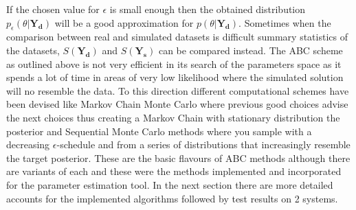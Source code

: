 \documentclass[12pt,a4paper,titlepage]{article}
\begin{document}
If the chosen value for $\epsilon$ is small enough then the obtained distribution $p_\epsilon(\theta | \mathbf{Y_{d}})$ will be a good approximation for $p(\theta | \mathbf{Y_{d}})$. Sometimes when the comparison between real and simulated datasets is difficult summary statistics of the datasets, $S(\mathbf{Y_{d}})$ and $S(\mathbf{Y_{s}})$ can be compared instead. The ABC scheme as outlined above is not very efficient in its search of the parameters space as it spends a lot of time in areas of very low likelihood where the simulated solution will no resemble the data. To this direction different computational schemes have been devised like Markov Chain Monte Carlo\cite{marjoram2003markov} where previous good choices advise the next choices thus creating a Markov Chain with stationary distribution the posterior and Sequential Monte Carlo methods where you sample with a decreasing $\epsilon$-schedule and from a series of distributions that increasingly resemble the target posterior\cite{del2006sequential, sisson2007sequential, toni2009abc}. These are the basic flavours of ABC methods although there are variants of each and these were the methods implemented and incorporated for the parameter estimation tool. In the next section there are more detailed accounts for the implemented algorithms followed by test results on 2 systems.
\end{document}
